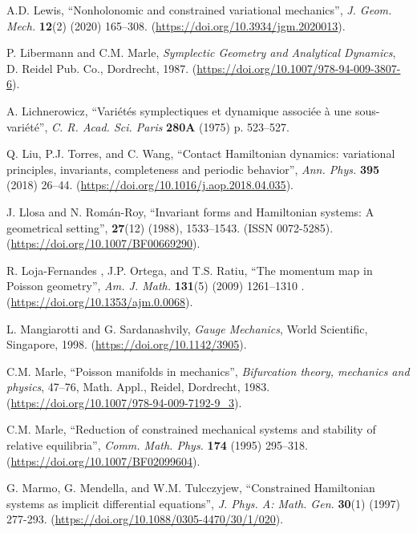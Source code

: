 \documentclass[12pt]{report}
\begin{document}
\begin{thebibliography}{999}
A.D. Lewis,
``Nonholonomic and constrained variational mechanics'', 
{\sl J. Geom. Mech.} {\bf 12}(2) (2020) 165--308. 
(\url{https://doi.org/10.3934/jgm.2020013}).

P. Libermann and C.M. Marle,
{\it Symplectic Geometry and Analytical Dynamics\/},
D. Reidel Pub. Co., Dordrecht, 1987.
(\url{https://doi.org/10.1007/978-94-009-3807-6}).

A. Lichnerowicz, 
``Vari\'et\'es symplectiques et dynamique associ\'ee \`a une sous-vari\' et\' e'',
{\sl C. R. Acad. Sci. Paris} {\bf 280A} (1975) p. 523--527.

Q. Liu, P.J. Torres, and C. Wang,
``Contact Hamiltonian dynamics: variational principles, invariants, completeness and periodic behavior'',
{\sl Ann. Phys.} {\bf 395} (2018) 26--44.
(\url{https://doi.org/10.1016/j.aop.2018.04.035}).

\newblock J. Llosa and N. Rom\'an-Roy,
\newblock ``Invariant forms and Hamiltonian systems: A geometrical setting'',
 \textbf{27}(12) (1988), 1533--1543.
(ISSN 0072-5285).
(\url{https://doi.org/10.1007/BF00669290}).

R. Loja-Fernandes , J.P. Ortega, and T.S. Ratiu,
``The momentum map in Poisson geometry'',
{\sl Am. J. Math.} {\bf 131}(5) (2009) 1261--1310 .
(\url{https://doi.org/10.1353/ajm.0.0068}).


L. Mangiarotti and G. Sardanashvily, 
{\it Gauge Mechanics}, 
World Scientific, Singapore, 1998.
(\url{https://doi.org/10.1142/3905}).

C.M. Marle, 
``Poisson manifolds in mechanics'',
{\sl  Bifurcation theory, mechanics and physics},  47--76, 
Math. Appl., Reidel, Dordrecht, 1983.
(\url{https://doi.org/10.1007/978-94-009-7192-9_3}).

C.M. Marle,
``Reduction of constrained mechanical systems and stability of relative equilibria'',
{\sl Comm. Math. Phys.} {\bf 174} (1995) 295--318.
(\url{https://doi.org/10.1007/BF02099604}).

G. Marmo, G. Mendella, and W.M. Tulcczyjew,
``Constrained Hamiltonian systems as implicit differential equations'',
{\sl J. Phys. A: Math. Gen.} {\bf 30}(1) (1997) 277-293.
(\url{https://doi.org/10.1088/0305-4470/30/1/020}).


\end{thebibliography}
\end{document}
